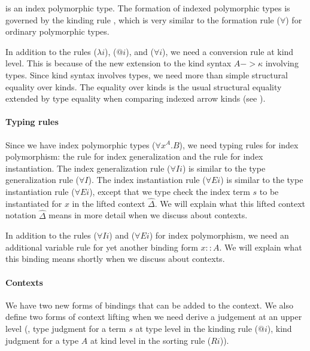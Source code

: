  is an index polymorphic type.
The formation of indexed polymorphic types is governed by
the kinding rule , which is very similar to
the formation rule ($\forall$) for ordinary polymorphic types.

In addition to the rules ($\lambda i$), ($@ i$), and ($\forall i$),
we need a conversion rule  at kind level. This is because of
the new extension to the kind syntax $A -> \kappa$ involving types.
Since kind syntax involves types, we need more than simple structural
equality over kinds. The equality over kinds is the usual structural
equality extended by type equality when comparing indexed arrow kinds
(see ).

\paragraph{Typing rules}
Since we have index polymorphic types ($\forall x^A . B$),
we need typing rules for index polymorphism:
the rule  for index generalization
and the rule  for index instantiation.
The index generalization rule ($\forall I i$) is similar to
the type generalization rule ($\forall I$).
The index instantiation rule ($\forall E i$) is similar to
the type instantiation rule ($\forall E i$), except that
we type check the index term $s$ to be instantiated for $x$
in the lifted context $\hat\Delta$.
We will explain what this lifted context notation $\hat\Delta$ means
in more detail when we discuss about contexts.

In addition to the rules ($\forall I i$) and ($\forall E i$) for
index polymorphism, we need an additional variable rule \newFi{($::$)}
for yet another binding form $x::A$.
We will explain what this binding means shortly when we discuss about contexts.

\paragraph{Contexts}
We have two new forms of bindings that can be added to the context.
We also define two forms of context lifting when we need derive a judgement
at an upper level (\eg,
type judgment for a term $s$ at type level in the kinding rule ($@i$),
kind judgment for a type $A$ at kind level in the sorting rule ($Ri$)).

